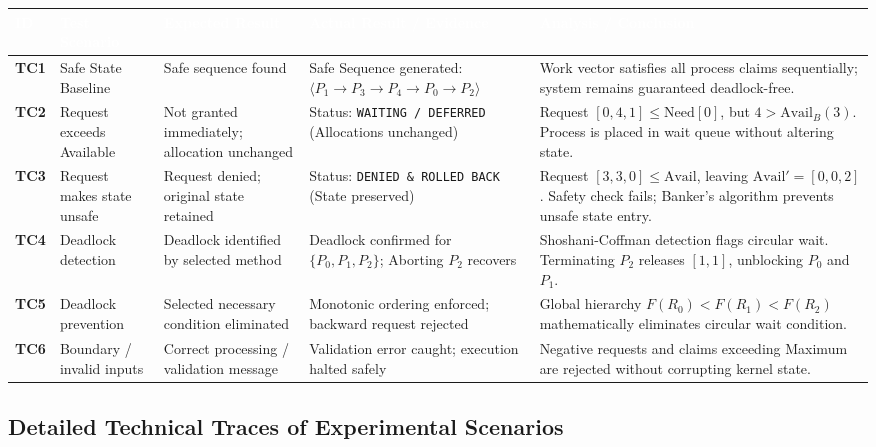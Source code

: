\documentclass[11pt,a4paper]{article}
\begin{document}
\begin{table}[h!]
\centering
\small
\renewcommand{\arraystretch}{1.25}
\begin{tabularx}{\textwidth}{|C{0.9cm}|L{2.6cm}|L{3.2cm}|L{3.9cm}|X|}
\hline
{}
\textcolor{white}{\textbf{ID}} & \textcolor{white}{\textbf{Test Scenario}} & \textcolor{white}{\textbf{Expected Result}} & \textcolor{white}{\textbf{Actual Result / Evidence}} & \textcolor{white}{\textbf{Analysis / Conclusion}} \\
\hline
\textbf{TC1} & Safe State Baseline & Safe sequence found & Safe Sequence generated: $\langle P_1 \to P_3 \to P_4 \to P_0 \to P_2 \rangle$ & Work vector satisfies all process claims sequentially; system remains guaranteed deadlock-free. \\
\hline
\textbf{TC2} & Request exceeds Available & Not granted immediately; allocation unchanged & Status: \texttt{WAITING / DEFERRED} (Allocations unchanged) & Request $[0,4,1] \le \text{Need}[0]$, but $4 > \text{Avail}_B (3)$. Process is placed in wait queue without altering state. \\
\hline
\textbf{TC3} & Request makes state unsafe & Request denied; original state retained & Status: \texttt{DENIED \& ROLLED BACK} (State preserved) & Request $[3,3,0] \le \text{Avail}$, leaving $\text{Avail}'=[0,0,2]$. Safety check fails; Banker's algorithm prevents unsafe state entry. \\
\hline
\textbf{TC4} & Deadlock detection & Deadlock identified by selected method & Deadlock confirmed for $\{P_0, P_1, P_2\}$; Aborting $P_2$ recovers & Shoshani-Coffman detection flags circular wait. Terminating $P_2$ releases $[1,1]$, unblocking $P_0$ and $P_1$. \\
\hline
\textbf{TC5} & Deadlock prevention & Selected necessary condition eliminated & Monotonic ordering enforced; backward request rejected & Global hierarchy $F(R_0) < F(R_1) < F(R_2)$ mathematically eliminates circular wait condition. \\
\hline
\textbf{TC6} & Boundary / invalid inputs & Correct processing / validation message & Validation error caught; execution halted safely & Negative requests and claims exceeding Maximum are rejected without corrupting kernel state. \\
\hline
\end{tabularx}
\end{table}

\subsection{Detailed Technical Traces of Experimental Scenarios}
\end{document}
